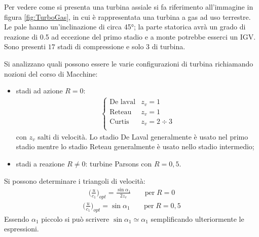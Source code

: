Per vedere come si presenta una turbina assiale si fa riferimento all'immagine in figura \ref{fig:TurboGas}, in cui è rappresentata una turbina a gas ad uso terrestre. Le pale hanno un'inclinazione di circa \ang{45}; la parte statorica avrà un grado di reazione di 0.5 ad eccezione del primo stadio e a monte potrebbe esserci un IGV. Sono presenti $17$ stadi di compressione e solo $3$ di turbina. 

Si analizzano quali possono essere le varie configurazioni di turbina richiamando nozioni del corso di Macchine:
\begin{itemize}
	\item stadi ad azione $R = 0$:
	\begin{align*}
	\begin{cases}
	\mbox{De laval} & z_v = 1\\
	\mbox{Reteau} & z_v = 1\\
	\mbox{Curtis} & z_v = 2 \div 3\\
	\end{cases}
	\end{align*}
	con $z_v$ salti di velocità. Lo stadio De Laval generalmente è usato nel primo stadio mentre lo stadio Reteau generalmente è usato nello stadio intermedio;
	\item stadi a reazione $R\neq 0$: turbine Parsons con $R = 0,5$.
\end{itemize}

Si possono determinare i triangoli di velocità:
\begin{align*}
\bigg( \frac{u}{c_1} \bigg)_{opt} = \frac{\sin \alpha_1}{2 z_v} \;\;\;\;\;\;\; \mbox{per} \; R = 0
\end{align*}
\begin{align*}
\bigg( \frac{u}{c_1} \bigg)_{opt} = \sin \alpha_1 \;\;\;\;\;\;\; \mbox{per} \; R = 0,5
\end{align*}
Essendo $\alpha_1$ piccolo si può scrivere $ \sin \alpha_1 \simeq \alpha_1$ semplificando ulteriormente le espressioni.

